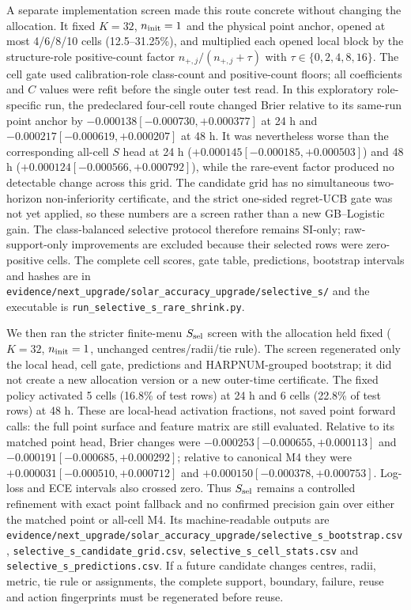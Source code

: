 \documentclass[11pt,a4paper]{article}
\numberwithin{equation}{section}
\theoremstyle{definition}\newtheorem{definition}[theorem]{Definition}
\theoremstyle{remark}\newtheorem{remark}[theorem]{Remark}
\begin{document}
A separate implementation screen made this route concrete without changing the allocation. It fixed $K=32$, $n_{\rm init}=1$ and the physical point anchor, opened at most 4/6/8/10 cells (12.5--31.25\%), and multiplied each opened local block by the structure-role positive-count factor $n_{+,j}/(n_{+,j}+\tau)$ with $\tau\in\{0,2,4,8,16\}$. The cell gate used calibration-role class-count and positive-count floors; all coefficients and $C$ values were refit before the single outer test read. In this exploratory role-specific run, the predeclared four-cell route changed Brier relative to its same-run point anchor by $-0.000138[-0.000730,+0.000377]$ at 24 h and $-0.000217[-0.000619,+0.000207]$ at 48 h. It was nevertheless worse than the corresponding all-cell $S$ head at 24 h ($+0.000145[-0.000185,+0.000503]$) and 48 h ($+0.000124[-0.000566,+0.000792]$), while the rare-event factor produced no detectable change across this grid. The candidate grid has no simultaneous two-horizon non-inferiority certificate, and the strict one-sided regret-UCB gate was not yet applied, so these numbers are a screen rather than a new GB--Logistic gain. The class-balanced selective protocol therefore remains SI-only; raw-support-only improvements are excluded because their selected rows were zero-positive cells. The complete cell scores, gate table, predictions, bootstrap intervals and hashes are in \texttt{evidence/next\_upgrade/solar\_accuracy\_upgrade/selective\_s/} and the executable is \texttt{run\_selective\_s\_rare\_shrink.py}.

We then ran the stricter finite-menu $S_{\rm sel}$ screen with the allocation held fixed ($K=32$, $n_{\rm init}=1$, unchanged centres/radii/tie rule). The screen regenerated only the local head, cell gate, predictions and HARPNUM-grouped bootstrap; it did not create a new allocation version or a new outer-time certificate. The fixed policy activated 5 cells (16.8\% of test rows) at 24 h and 6 cells (22.8\% of test rows) at 48 h. These are local-head activation fractions, not saved point forward calls: the full point surface and feature matrix are still evaluated. Relative to its matched point head, Brier changes were $-0.000253[-0.000655,+0.000113]$ and $-0.000191[-0.000685,+0.000292]$; relative to canonical M4 they were $+0.000031[-0.000510,+0.000712]$ and $+0.000150[-0.000378,+0.000753]$. Log-loss and ECE intervals also crossed zero. Thus $S_{\rm sel}$ remains a controlled refinement with exact point fallback and no confirmed precision gain over either the matched point or all-cell M4. Its machine-readable outputs are \texttt{evidence/next\_upgrade/solar\_accuracy\_upgrade/selective\_s\_bootstrap.csv}, \texttt{selective\_s\_candidate\_grid.csv}, \texttt{selective\_s\_cell\_stats.csv} and \texttt{selective\_s\_predictions.csv}. If a future candidate changes centres, radii, metric, tie rule or assignments, the complete support, boundary, failure, reuse and action fingerprints must be regenerated before reuse.
\end{document}

